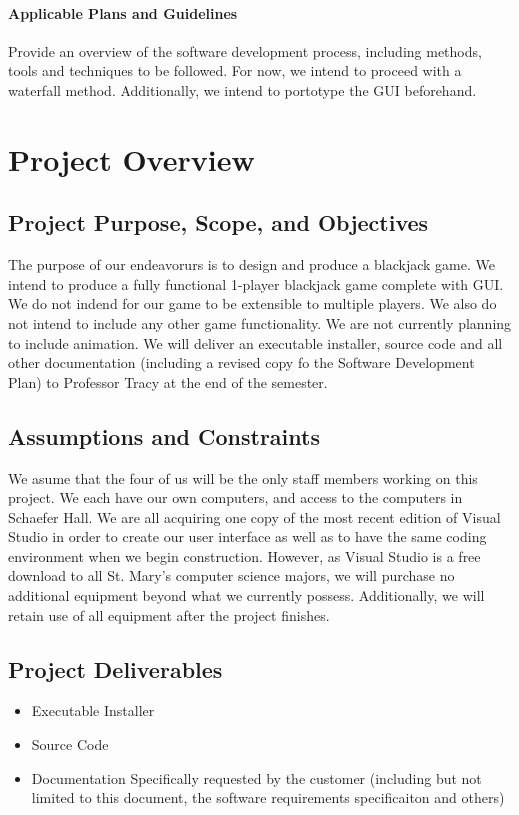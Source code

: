\documentclass{article}
\begin{document}
\paragraph{Applicable Plans and Guidelines} Provide an overview of the software development process, including methods, tools and techniques to be followed. For now, we intend to proceed with a waterfall method. Additionally, we intend to portotype the GUI beforehand.
\section{Project Overview}
\subsection{Project Purpose, Scope, and Objectives}
The purpose of our endeavorurs is to design and produce a blackjack game. We intend to produce a fully functional 1-player blackjack game complete with GUI.
We do not indend for our game to be extensible to multiple players. We also do not intend to include any other game functionality. We are not currently planning to include animation.
We will deliver an executable installer, source code and all other documentation (including a revised copy fo the Software Development Plan) to Professor Tracy at the end of the semester.
\subsection{Assumptions and Constraints}
We asume that the four of us will be the only staff members working on this project. We each have our own computers, and access to the computers in Schaefer Hall. We are all acquiring one copy of the most recent edition of Visual Studio in order to create our user interface as well as to have the same coding environment when we begin construction. However, as Visual Studio is a free download to all St. Mary's computer science majors, we will purchase no additional equipment beyond what we currently possess. Additionally, we will retain use of all equipment after the project finishes.
\subsection{Project Deliverables}
\begin{itemize}
\item Executable Installer
\item Source Code
\item Documentation Specifically requested by the customer (including but not limited to this document, the software requirements specificaiton and others)
\end{itemize}
\end{document}
